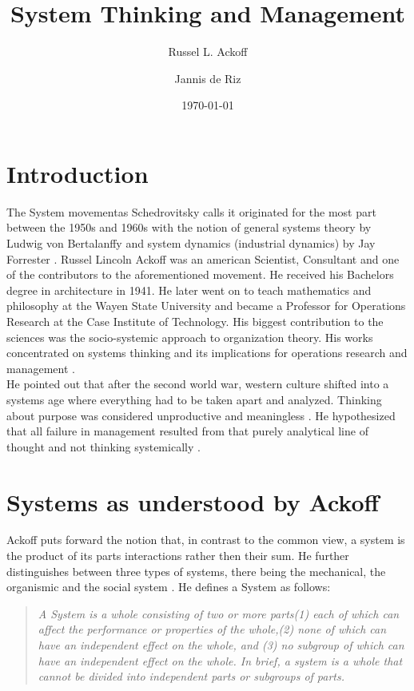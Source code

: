 \documentclass{scrartcl}
\title{System Thinking and Management}
\subtitle{Russel L. Ackoff}
\author{Jannis de Riz}
\date{\today}
\begin{document}
\maketitle
\section{Introduction}
The \glqq System movement\grqq as Schedrovitsky calls it \cite{shchedrovitsky1981principles} originated for the most part between the 1950s and 1960s with the notion of general systems theory by Ludwig von Bertalanffy and system dynamics (industrial dynamics) by Jay Forrester  \cite{von1956general} \cite{forrester1994system} \cite{forrester1997industrial} \cite{forrester1968industrial}. 
Russel Lincoln Ackoff was an american Scientist, Consultant and one of the contributors to the aforementioned movement. He received his Bachelors degree in architecture in 1941. He later went on to teach mathematics and philosophy at the Wayen State University and became a Professor for Operations Research at the Case Institute of Technology. His biggest contribution to the sciences was the socio-systemic approach to organization theory. His works concentrated on systems thinking and its implications for operations research and management \cite{ackoff1972note} \cite{ackoff1989data} \cite{sengupta1965systems} \cite{ackoff2006few}. \\ 
He pointed out that after the second world war, western culture shifted into a systems age where everything had to be taken apart and analyzed. Thinking about purpose was considered unproductive and meaningless \cite{ackoff1972note}. He hypothesized that all failure in management resulted from that purely analytical line of thought and not thinking systemically \cite{shortspeech}. 

\section{Systems as understood by Ackoff}

Ackoff puts forward the notion that, in contrast to the common view, a system is the product of its parts interactions rather then their sum. He further distinguishes between three types of systems, there being the mechanical, the organismic and the social system \cite{ackoff1994systems}. 
He defines a System as follows: \\ 

\begin{quote}\itshape{\glqq A System is a whole consisting of two or more parts(1) each of which can affect the performance or properties of the whole,(2) none of which can have an independent effect on the whole, and (3) no subgroup of which can have an independent effect on the whole. In brief, a system is a whole that cannot be divided into independent parts or subgroups of parts. \grqq 
	}
\end{quote}	
\end{document}
